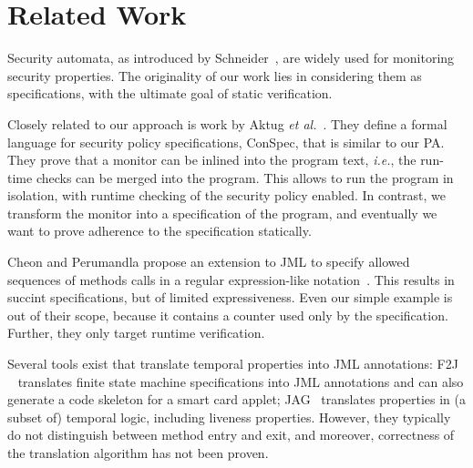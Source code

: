 \section{Related Work}\label{SecRelated}

Security automata, as introduced by Schneider~\cite{Schneider99}, are
widely used for monitoring security properties. The originality of our
work lies in considering them as specifications, with the ultimate
goal of static verification. 

Closely related to our approach is work by Aktug \emph{et
al.}~\cite{Aktug07,AktugDG08}. They define a formal language for
security policy specifications, ConSpec, that is similar to our
PA. They prove that a monitor can be inlined into the program text,
\emph{i.e.}, the run-time checks can be merged into the program. This
allows to run the program in isolation, with runtime checking of the
security policy enabled. In contrast, we transform the monitor into a
specification of the program, and eventually we want to prove
adherence to the specification statically.

Cheon and Perumandla propose an extension to JML to specify allowed
sequences of methods calls in a regular expression-like
notation~\cite{Cheon07}.  This results in succint specifications, but
of limited expressiveness. Even our simple example is out of their
scope, because it contains a counter used only by the
specification. Further, they only target runtime verification. 

Several tools exist that translate temporal properties into JML
annotations: F2J ~\cite{Hubbers03} translates finite state machine
specifications into JML annotations and can also generate a code
skeleton for a smart card applet; JAG~\cite{Giorgetti06} translates
properties in (a subset of) temporal logic, including liveness
properties.  However, they typically do not distinguish between method
entry and exit, and moreover, correctness of the translation algorithm
has not been proven.

